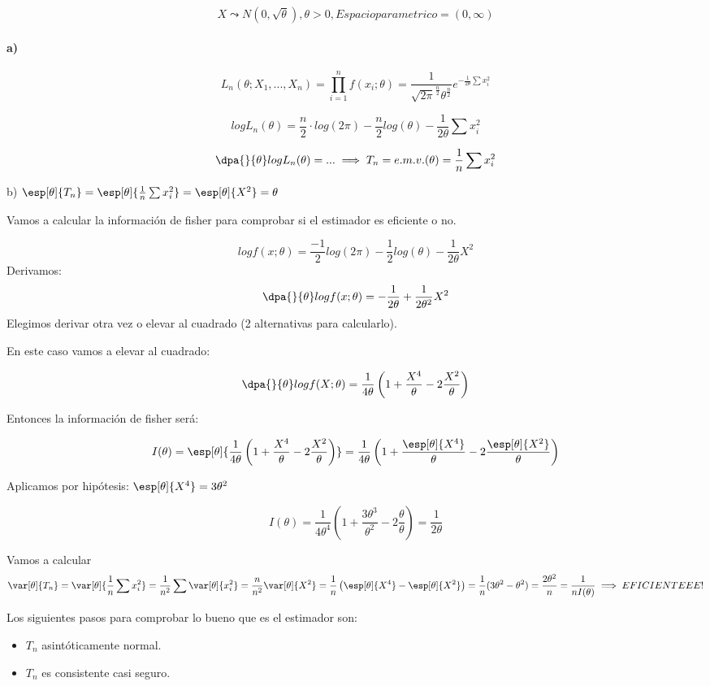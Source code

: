 \begin{problem}[2]
\[X\leadsto N(0,\sqrt{\theta}), \theta>0, Espacioparametrico = (0,\infty)\]
\solution
\paragraph{a)}
\[L_n(\theta;X_1,...,X_n) = \prod_{i=1}^n f(x_i;\theta) = \frac{1}{\sqrt{2\pi}^{\frac{n}{2}}\theta^{\frac{n}{2}}} e ^ {-\frac{1}{2\theta} \sum x_i^2}\]

\[logL_n(\theta) = \frac{n}{2}\cdot log(2\pi) - \frac{n}{2}log(\theta) - \frac{1}{2\theta} \sum x_i^2\]

\[\dpa{}{\theta} logL_n(\theta) = ... \implies T_n = e.m.v.(\theta) = \frac{1}{n}\sum x_i^2\]


b) $\esp[\theta]{T_n} = \esp[\theta]{\frac{1}{n}\sum x_i^2} = \esp[\theta]{X^2} = \theta$

Vamos a calcular la información de fisher para comprobar si el estimador es eficiente o no.

\[ log f(x;\theta) = \frac{-1}{2}log(2\pi)-\frac{1}{2}log(\theta) - \frac{1}{2\theta}X^2\]
Derivamos:
\[\dpa{}{\theta} log f(x;\theta) = -\frac{1}{2\theta} + \frac{1}{2\theta^2}X^2\]
Elegimos derivar otra vez o elevar al cuadrado (2 alternativas para calcularlo).

En este caso vamos a elevar al cuadrado:

\[\dpa{}{\theta}logf(X;\theta) = \frac{1}{4\theta} \left( 1+\frac{X^4}{\theta} - 2\frac{X^2}{\theta}\right)\]

Entonces la información de fisher será:

\[I(\theta) = \esp[\theta]{\frac{1}{4\theta} \left( 1+\frac{X^4}{\theta} - 2\frac{X^2}{\theta}\right)} = \frac{1}{4\theta} \left( 1+\frac{\esp[\theta]{X^4}}{\theta} - 2\frac{\esp[\theta]{X^2}}{\theta}\right)\]

Aplicamos por hipótesis: $\esp[\theta]{X^4} = 3\theta^2$

\[I(\theta) = \frac{1}{4\theta^4} \left(1+\frac{3\theta^3}{\theta^2} - 2 \frac{\theta}{\theta}\right) = \frac{1}{2\theta}\]

Vamos a calcular \[\var[\theta]{T_n} = \var[\theta]{\frac{1}{n}\sum x_i^2} = \frac{1}{n^2}\sum \var[\theta]{x_i^2} = \frac{n}{n^2} \var[\theta]{X^2} = \frac{1}{n}\left(\esp[\theta]{X^4} - \esp[\theta]{X^2}\right) = \frac{1}{n}(3\theta^2-\theta^2) = \frac{2\theta^2}{n} = \frac{1}{nI(\theta)} \implies EFICIENTEEE!\]

Los siguientes pasos para comprobar lo bueno que es el estimador son: \begin{itemize}
\item $T_n$ asintóticamente normal.
\item $T_n$ es consistente casi seguro.
\end{itemize}


\end{problem}
